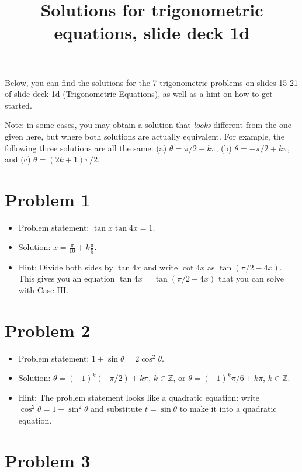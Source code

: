 \documentclass{amsart}
\title{Solutions for trigonometric equations, slide deck 1d}
\begin{document}
\maketitle

Below, you can find the solutions for the 7 trigonometric problems on slides
15-21 of slide deck 1d (Trigonometric Equations), as well as a hint on how to
get started.

Note: in some cases, you may obtain a solution that \emph{looks} different from the one given here, but where both solutions are actually equivalent. For example, the following three solutions are all the same: (a) $\theta = \pi/2 + k\pi$, (b) $\theta = - \pi/2 + k \pi$, and (c) $\theta = (2k + 1) \pi/2$.

\section*{Problem 1}

\begin{itemize}
  \item Problem statement: $\tan x \tan 4x = 1$.
  \item Solution: $x = \frac{\pi}{10} + k \frac{\pi}{5}$.
  \item Hint: Divide both sides by $\tan 4x$ and write $\cot 4x$ as $\tan \left( \pi/2 - 4x\right)$. This gives you an equation $\tan 4x = \tan (\pi/2 - 4x)$ that you can solve with Case III.
  \end{itemize}  

\section*{Problem 2}

\begin{itemize}
  \item Problem statement: $1 + \sin \theta = 2\cos^2\theta$.
  \item Solution: $\theta = (-1)^k (-\pi/2) + k \pi$, $k \in \mathbb{Z}$, or $\theta = (-1)^k \pi/6 + k \pi$, $k \in \mathbb{Z}$.
  \item Hint: The problem statement looks like a quadratic equation: write $\cos^2 \theta = 1 - \sin^2 \theta$ and substitute $t = \sin \theta$ to make it into a quadratic equation.
  \end{itemize}  

\section*{Problem 3}
\end{document}
